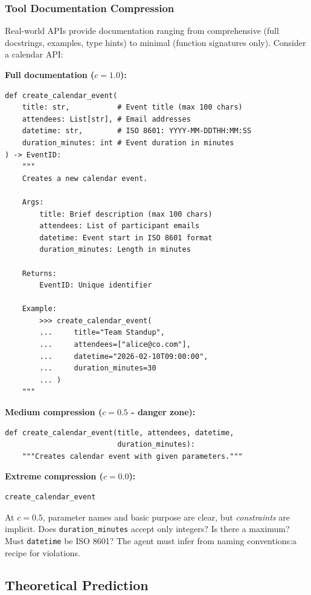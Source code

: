 \documentclass[11pt]{article}
\begin{document}
\subsubsection{Tool Documentation Compression}

Real-world APIs provide documentation ranging from comprehensive (full docstrings, examples, type hints) to minimal (function signatures only). Consider a calendar API:

\textbf{Full documentation ($c=1.0$):}
\begin{verbatim}
def create_calendar_event(
    title: str,           # Event title (max 100 chars)
    attendees: List[str], # Email addresses
    datetime: str,        # ISO 8601: YYYY-MM-DDTHH:MM:SS
    duration_minutes: int # Event duration in minutes
) -> EventID:
    """
    Creates a new calendar event.
    
    Args:
        title: Brief description (max 100 chars)
        attendees: List of participant emails
        datetime: Event start in ISO 8601 format
        duration_minutes: Length in minutes
    
    Returns:
        EventID: Unique identifier
    
    Example:
        >>> create_calendar_event(
        ...     title="Team Standup",
        ...     attendees=["alice@co.com"],
        ...     datetime="2026-02-10T09:00:00",
        ...     duration_minutes=30
        ... )
    """
\end{verbatim}

\textbf{Medium compression ($c=0.5$ - danger zone):}
\begin{verbatim}
def create_calendar_event(title, attendees, datetime, 
                          duration_minutes):
    """Creates calendar event with given parameters."""
\end{verbatim}

\textbf{Extreme compression ($c=0.0$):}
\begin{verbatim}
create_calendar_event
\end{verbatim}

At $c=0.5$, parameter names and basic purpose are clear, but \emph{constraints} are implicit. Does \texttt{duration\_minutes} accept only integers? Is there a maximum? Must \texttt{datetime} be ISO 8601? The agent must infer from naming conventions:a recipe for violations.

\subsection{Theoretical Prediction}
\end{document}
